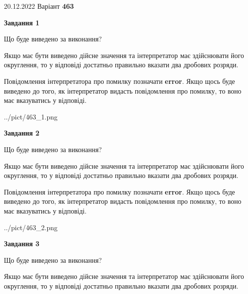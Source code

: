 \documentclass[12pt, ukrainian]{article}
\begin{document}
{20.12.2022 Варіант \No \textbf { 463 }\par}
{
\begin {Large}

{\begin {center}\textbf{Завдання 1}\end {center}}\par
Що буде виведено за виконання? \par

Якщо має бути виведено дійсне значення та інтерпретатор має здійснювати його округлення, 
то у відповіді достатньо правильно вказати два дробових розряди.

Повідомлення інтерпретатора про помилку позначати \textbf{error}.
Якщо щось буде виведено до того, як інтерпретатор видасть повідомлення про помилку, 
то воно має вказуватись у відповіді. \par

\begin{center}
	{../pict/463_1.png}
\end{center}
\newpage

{\begin {center}\textbf{Завдання 2}\end {center}}\par
Що буде виведено за виконання? \par

Якщо має бути виведено дійсне значення та інтерпретатор має здійснювати його округлення, 
то у відповіді достатньо правильно вказати два дробових розряди.

Повідомлення інтерпретатора про помилку позначати \textbf{error}.
Якщо щось буде виведено до того, як інтерпретатор видасть повідомлення про помилку, 
то воно має вказуватись у відповіді. \par

\begin{center}
	{../pict/463_2.png}
\end{center}
\newpage

{\begin {center}\textbf{Завдання 3}\end {center}}\par
Що буде виведено за виконання? \par

Якщо має бути виведено дійсне значення та інтерпретатор має здійснювати його округлення, 
то у відповіді достатньо правильно вказати два дробових розряди.


\end{Large}}
\end{document}
